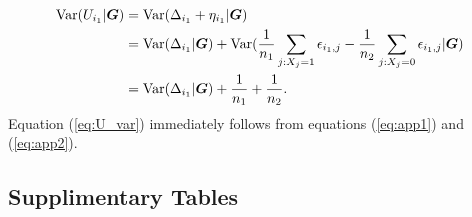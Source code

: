 \begin{appendices}
\begin{equation}
	\begin{aligned}
		\text{Var}(U_{i_1}|\bm G) &= \text{Var}(\Delta_{i_1} + \eta_{i_1} |\bm G) \\
		& = \text{Var}(\Delta_{i_1}|\bm G) + \text{Var}(\dfrac{1}{n_1}\sum_{j: X_j=1}\epsilon_{i_1,j}-
		\dfrac{1}{n_2}\sum_{j: X_j=0}\epsilon_{i_1,j}|\bm G)\\
		& =\text{Var}(\Delta_{i_1}|\bm G) + \frac{1}{n_1} + \frac{1}{n_2}. 
	\end{aligned}
	\end{equation}
	Equation (\ref{eq:U_var}) immediately follows from equations (\ref{eq:app1}) and 
	(\ref{eq:app2}).	
	
	
	
	\subsection{Supplimentary Tables}\label{app:supp}
	
	
		\begin{table}[H]
			\centering
			\caption[Summary information for the 24 experiments used in Chapter 
			\ref{chap1}]{Summary of data sets used in the three groups: the seedling, the leaf and 
			the 
				multi-tissue groups.} 
			\label{app:24experiments}
\end{table}
\end{appendices}

